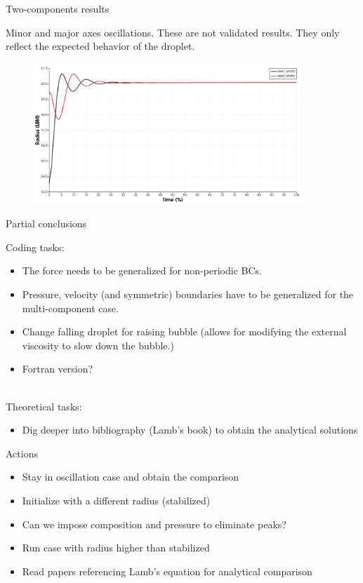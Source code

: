 \documentclass{beamer}
\begin{document}
	\begin{frame}{Two-components results}
		
		Minor and major axes oscillations. These are not validated results. They only reflect the expected behavior of the droplet.
		\begin{figure}
			\centering
			\includegraphics[width=0.9\textwidth]{pics/TwoCMP_MRT_OscRadius.png}
		\end{figure}
	\end{frame}

	\begin{frame}{Partial conclusions}
		
		Coding tasks:
		\begin{itemize}
			\item The force needs to be generalized for non-periodic BCs. 
			\item Pressure, velocity (and symmetric) boundaries have to be generalized for the multi-component case.
			\item Change falling droplet for raising bubble (allows for modifying the external viscosity to slow down the bubble.)
			\item Fortran version?
		\end{itemize}
	
		~\\Theoretical tasks:
		\begin{itemize}
			\item Dig deeper into bibliography (Lamb's book) to obtain the analytical solutions
			
		\end{itemize}
	\end{frame}
	
	\begin{frame}{Actions}
	\begin{itemize}
		\item Stay in oscillation case and obtain the comparison
		\item Initialize with a different radius (stabilized)
		\item Can we impose composition and pressure to eliminate peaks?
		\item Run case with radius higher than stabilized
		
		\item Read papers referencing Lamb's equation for analytical comparison
	\end{itemize}
	\end{frame}
\end{document}
